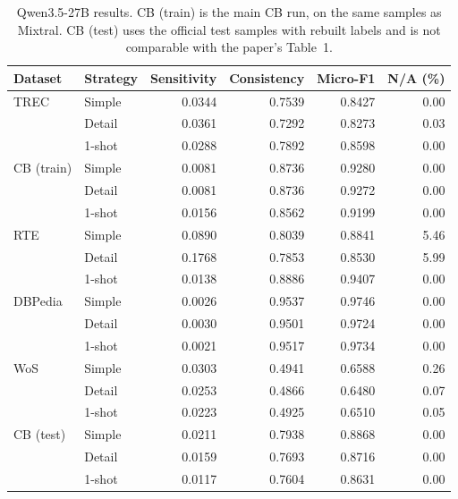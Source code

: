 \begin{table}[H]
\centering
\caption{Qwen3.5-27B results. CB (train) is the main CB run, on the same
samples as Mixtral. CB (test) uses the official test samples with rebuilt
labels and is not comparable with the paper's Table~1.}
\label{tab:qwen-results}
\small
\begin{tabular}{llrrrr}
\toprule
Dataset & Strategy & Sensitivity & Consistency & Micro-F1 & N/A (\%) \\
\midrule
TREC & Simple  & 0.0344 & 0.7539 & 0.8427 & 0.00 \\
     & Detail  & 0.0361 & 0.7292 & 0.8273 & 0.03 \\
     & 1-shot  & 0.0288 & 0.7892 & 0.8598 & 0.00 \\
\midrule
CB (train) & Simple  & 0.0081 & 0.8736 & 0.9280 & 0.00 \\
           & Detail  & 0.0081 & 0.8736 & 0.9272 & 0.00 \\
           & 1-shot  & 0.0156 & 0.8562 & 0.9199 & 0.00 \\
\midrule
RTE  & Simple  & 0.0890 & 0.8039 & 0.8841 & 5.46 \\
     & Detail  & 0.1768 & 0.7853 & 0.8530 & 5.99 \\
     & 1-shot  & 0.0138 & 0.8886 & 0.9407 & 0.00 \\
\midrule
DBPedia & Simple  & 0.0026 & 0.9537 & 0.9746 & 0.00 \\
        & Detail  & 0.0030 & 0.9501 & 0.9724 & 0.00 \\
        & 1-shot  & 0.0021 & 0.9517 & 0.9734 & 0.00 \\
\midrule
WoS  & Simple  & 0.0303 & 0.4941 & 0.6588 & 0.26 \\
     & Detail  & 0.0253 & 0.4866 & 0.6480 & 0.07 \\
     & 1-shot  & 0.0223 & 0.4925 & 0.6510 & 0.05 \\
\midrule
CB (test) & Simple  & 0.0211 & 0.7938 & 0.8868 & 0.00 \\
          & Detail  & 0.0159 & 0.7693 & 0.8716 & 0.00 \\
          & 1-shot  & 0.0117 & 0.7604 & 0.8631 & 0.00 \\
\bottomrule
\end{tabular}
\end{table}

